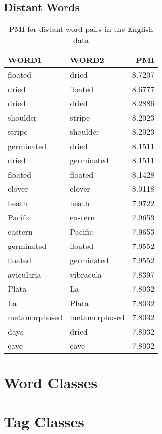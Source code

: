 \documentclass[a4paper]{article}
\begin{document}
    \subsection{Distant Words}

    \begin{table}[h!]
        \centering
        \caption{PMI for distant word pairs in the English data}
        \label{tab:dist_en}
        \begin{tabular}{llr}
        \toprule
                 WORD1 &          WORD2 &     PMI \\
        \midrule
               floated &          dried &  8.7207 \\
                 dried &        floated &  8.6777 \\
                 dried &          dried &  8.2886 \\
              shoulder &         stripe &  8.2023 \\
                stripe &       shoulder &  8.2023 \\
            germinated &          dried &  8.1511 \\
                 dried &     germinated &  8.1511 \\
               floated &        floated &  8.1428 \\
                clover &         clover &  8.0118 \\
                 heath &          heath &  7.9722 \\
               Pacific &        eastern &  7.9653 \\
               eastern &        Pacific &  7.9653 \\
            germinated &        floated &  7.9552 \\
               floated &     germinated &  7.9552 \\
            avicularia &      vibracula &  7.8397 \\
                 Plata &             La &  7.8032 \\
                    La &          Plata &  7.8032 \\
         metamorphosed &  metamorphosed &  7.8032 \\
                  days &          dried &  7.8032 \\
                  cave &           cave &  7.8032 \\
        \bottomrule
        \end{tabular}
    \end{table}

    \section{Word Classes}


    \section{Tag Classes}
\end{document}
